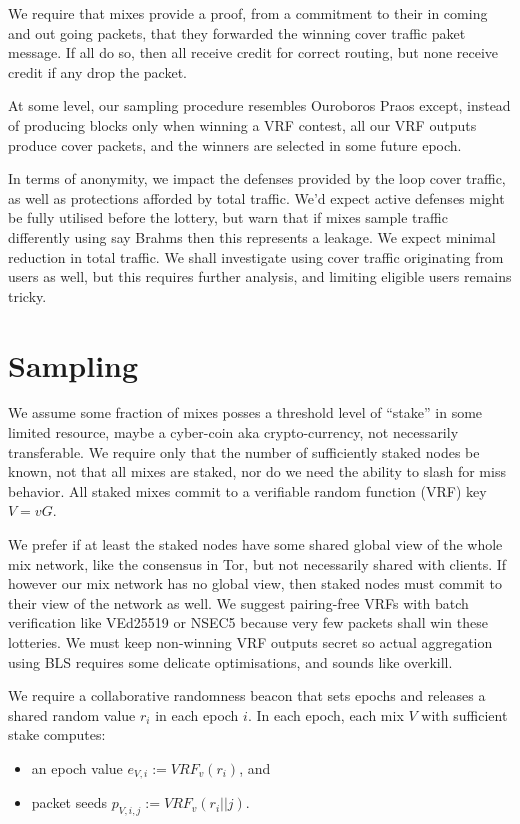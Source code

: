 ﻿\documentclass{sig-alternate-hotpets}
\begin{document}
We require that mixes provide a proof, from a commitment to their in coming and out going packets, that they forwarded the winning cover traffic paket message.  
If all do so, then all receive credit for correct routing, but none receive credit if any drop the packet.

At some level, our sampling procedure resembles Ouroboros Praos \cite{OuroborosPraos} except, instead of producing blocks only when winning a VRF contest, all our VRF outputs produce cover packets, and the winners are selected in some future epoch.  

In terms of anonymity, we impact the defenses provided by the loop cover traffic, as well as protections afforded by total traffic.  We’d expect active defenses might be fully utilised before the lottery, but warn that if mixes sample traffic differently using say Brahms then this represents a leakage.  We expect minimal reduction in total traffic.  We shall investigate using cover traffic originating from users as well, but this requires further analysis, and limiting eligible users remains tricky.

\section{Sampling} %

We assume some fraction of mixes posses a threshold level of ``stake'' in some limited resource, maybe a cyber-coin aka crypto-currency, not necessarily transferable.  We require only that the number of sufficiently staked nodes be known, not that all mixes are staked, nor do we need the ability to slash for miss behavior.  All staked mixes commit to a verifiable random function (VRF) key $V = v G$.  

We prefer if at least the staked nodes have some shared global view of the whole mix network, like the consensus in Tor, but not necessarily shared with clients.  If however our mix network has no global view, then staked nodes must commit to their view of the network as well.  We suggest pairing-free VRFs with batch verification like VEd25519 or NSEC5 because very few packets shall win these lotteries.  We must keep non-winning VRF outputs secret so actual aggregation using BLS requires some delicate optimisations, and sounds like overkill.

We require a collaborative randomness beacon that sets epochs and releases a shared random value $r_i$ in each epoch $i$.  In each epoch, each mix $V$ with sufficient stake computes:
\begin{itemize}
\item an epoch value $e_{V,i} := VRF_v(r_i)$, and
\item packet seeds $p_{V,i,j} := VRF_v(r_i || j)$.
\end{itemize}
\end{document}
